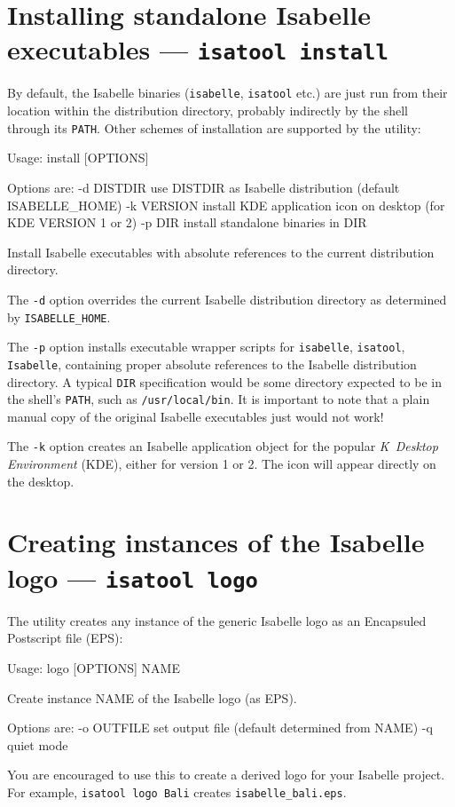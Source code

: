 \section{Installing standalone Isabelle executables --- \texttt{isatool install}}
\label{sec:tool-install}

By default, the Isabelle binaries (\texttt{isabelle}, \texttt{isatool} etc.)
are just run from their location within the distribution directory, probably
indirectly by the shell through its \texttt{PATH}.  Other schemes of
installation are supported by the  utility:
\begin{ttbox}
Usage: install [OPTIONS]

  Options are:
    -d DISTDIR   use DISTDIR as Isabelle distribution
                 (default ISABELLE_HOME)
    -k VERSION   install KDE application icon on desktop
                 (for KDE VERSION 1 or 2)                                       
    -p DIR       install standalone binaries in DIR

  Install Isabelle executables with absolute references to the current
  distribution directory.
\end{ttbox}

The \texttt{-d} option overrides the current Isabelle distribution directory
as determined by \texttt{ISABELLE_HOME}.

The \texttt{-p} option installs executable wrapper scripts for
\texttt{isabelle}, \texttt{isatool}, \texttt{Isabelle}, containing proper
absolute references to the Isabelle distribution directory.  A typical
\texttt{DIR} specification would be some directory expected to be in the
shell's \texttt{PATH}, such as \texttt{/usr/local/bin}.  It is important to
note that a plain manual copy of the original Isabelle executables just would
not work!

The \texttt{-k} option creates an Isabelle application object for the popular
\textsl{K~Desktop Environment} (KDE), either for version 1 or 2.
The icon will appear directly on the desktop.


\section{Creating instances of the Isabelle logo --- \texttt{isatool
    logo}}

The  utility creates any instance of the generic Isabelle logo as
an Encapsuled Postscript file (EPS):
\begin{ttbox}
Usage: logo [OPTIONS] NAME

  Create instance NAME of the Isabelle logo (as EPS).

  Options are:
    -o OUTFILE   set output file (default determined from NAME)
    -q           quiet mode
\end{ttbox}
You are encouraged to use this to create a derived logo for your Isabelle
project.  For example, \texttt{isatool logo Bali} creates
\texttt{isabelle_bali.eps}.


